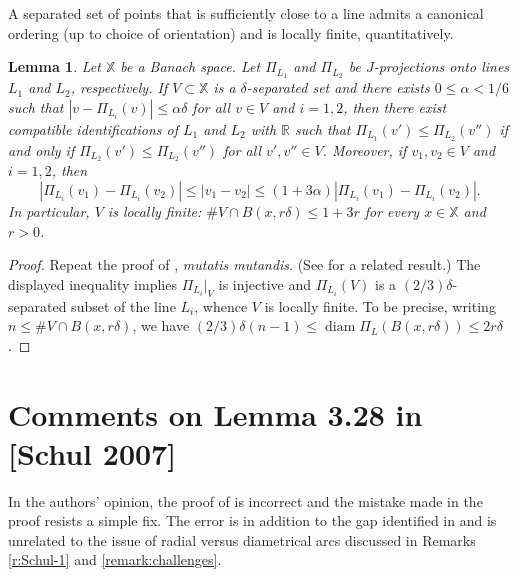 \documentclass[12pt]{amsart}
\numberwithin{equation}{section}
\theoremstyle{plain}
\newtheorem{lemma}[theorem]{Lemma}
\theoremstyle{definition}
\def\RR{\mathbb{R}}
\def\XX{{\mathbb{X}}}
\newcommand{\diam}{\mathop\mathrm{diam}\nolimits}
\numberwithin{figure}{section}
\begin{document}
A separated set of points that is sufficiently close to a line admits a canonical ordering (up to choice of orientation) and is locally finite, quantitatively.

\begin{lemma}\label{l:count} Let $\XX$ be a Banach space. Let $\Pi_{L_1}$ and $\Pi_{L_2}$ be $J$-projections onto lines $L_1$ and $L_2$, respectively. If $V\subset \XX$ is a $\delta$-separated set and there exists $0\leq \alpha<1/6$ such that $|v-\Pi_{L_i}(v)|\leq \alpha\delta$ for all $v\in V$ and $i=1,2$, then there exist compatible identifications of $L_1$ and $L_2$ with $\RR$ such that $\Pi_{L_1}(v')\leq \Pi_{L_2}(v'')$ if and only if $\Pi_{L_2}(v')\leq \Pi_{L_2}(v'')$ for all $v',v''\in V$. Moreover, if $v_1,v_2\in V$ and $i=1,2$, then $$|\Pi_{L_i}(v_1)-\Pi_{L_i}(v_2)|\leq |v_1-v_2|\leq (1+3\alpha)|\Pi_{L_i}(v_1)-\Pi_{L_i}(v_2)|.$$ In particular, $V$ is locally finite: $\# V\cap B(x,r\delta)\leq 1+3r$ for every $x\in \XX$ and $r>0$.\end{lemma}

\begin{proof} Repeat the proof of \cite[Lemma 2.1]{Badger-McCurdy-1}, \emph{mutatis mutandis}. (See \cite[Lemma 2.18]{Badger-McCurdy-1} for a related result.) The displayed inequality implies $\Pi_{L_i}|_V$ is injective and $\Pi_{L_i}(V)$ is a $(2/3)\delta$-separated subset of the line $L_i$, whence $V$ is locally finite. To be precise, writing $n\leq\#V\cap B(x,r\delta)$, we have $(2/3)\delta (n-1) \leq \diam \Pi_L(B(x,r\delta))\leq 2r\delta$.\end{proof}

\section{Comments on Lemma 3.28 in [Schul 2007]}\label{appendix328}

In the authors' opinion, the proof of \cite[Lemma 3.28]{Schul-Hilbert} is incorrect and the mistake made in the proof resists a simple fix. The error is in addition to the gap identified in \cite[Remark 3.8]{Badger-McCurdy-1} and is unrelated to the issue of radial versus diametrical arcs discussed in Remarks \ref{r:Schul-1} and \ref{remark:challenges}.
\end{document}
